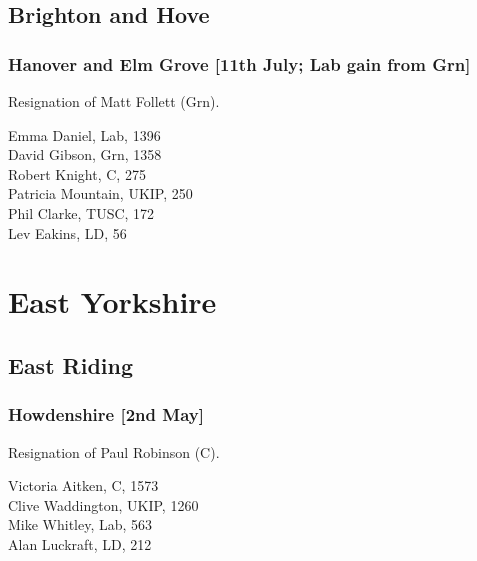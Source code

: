 \documentclass[a4paper,openany,10pt]{book}
\begin{document}
\subsection*{Brighton and Hove}

\subsubsection*{Hanover and Elm Grove \hspace*{\fill}\nolinebreak[1]%
\enspace\hspace*{\fill}
[11th July; Lab gain from Grn]}


Resignation of Matt Follett (Grn).



Emma Daniel, Lab, 1396\\
David Gibson, Grn, 1358\\
Robert Knight, C, 275\\
Patricia Mountain, UKIP, 250\\
Phil Clarke, TUSC, 172\\
Lev Eakins, LD, 56\\


\section[East Yorkshire]{{East Yorkshire}}

\subsection*{East Riding}

\subsubsection*{Howdenshire \hspace*{\fill}\nolinebreak[1]%
\enspace\hspace*{\fill}
[2nd May]}


Resignation of Paul Robinson (C).



Victoria Aitken, C, 1573\\
Clive Waddington, UKIP, 1260\\
Mike Whitley, Lab, 563\\
Alan Luckraft, LD, 212\\
\end{document}
